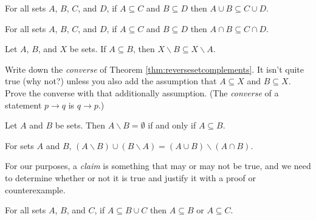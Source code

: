 \begin{theorem} For all sets $A$, $B$, $C$, and $D$, if $A\subseteq C$ and $B\subseteq D$ then $A\cup B \subseteq C\cup D$.
\end{theorem}

\begin{theorem} For all sets $A$, $B$, $C$, and $D$, if $A\subseteq C$ and $B\subseteq D$ then $A\cap B \subseteq C\cap D$.
\end{theorem}

\begin{theorem} \label{thm:reversesetcomplements}Let $A$, $B$, and $X$ be sets. If $A \subseteq B$, then $X \smallsetminus B \subseteq X \smallsetminus A$.
\end{theorem}

\begin{exercise} Write down the \textit{converse} of Theorem \ref{thm:reversesetcomplements}. It isn't quite true (why not?) unless you also add the assumption that $A\subseteq X$ and $B\subseteq X$.  Prove the converse with that additionally assumption. (The \textit{converse} of a statement $p \to q$ is $q \to p$.)
\end{exercise}

\begin{theorem} Let $A$ and $B$ be sets. Then $A\smallsetminus B = \emptyset$ if and only if $A \subseteq B$.
\end{theorem}

\begin{theorem} For sets $A$ and $B$, $(A\smallsetminus B)\cup (B\smallsetminus A) = (A\cup B) \smallsetminus (A\cap B)$.
\end{theorem}

For our purposes, a \textit{claim} is something that may or may not be true, and we need to determine whether or not it is true and justify it with a proof or counterexample.

\begin{claim} For all sets $A$, $B$, and $C$, if $A \subseteq B\cup C$ then $A\subseteq B$ or $A\subseteq C$.
\end{claim}

